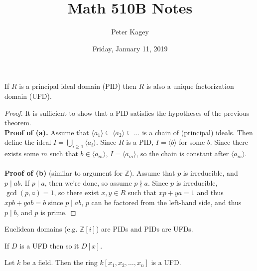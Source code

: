 \documentclass{article}
\newenvironment{note}[1][Note.]{
  \begin{trivlist} \item[\hskip \labelsep {\bfseries #1}]
}{\end{trivlist}}
\newenvironment{theorem}[1][Theorem.]{
  \begin{trivlist} \item[\hskip \labelsep {\bfseries #1}]
}{\end{trivlist}}
\newcommand{\ang}[1]{\langle #1 \rangle}
\begin{document}
\title{Math 510B Notes}
\author{Peter Kagey}
\date{Friday, January 11, 2019}

\maketitle

\begin{theorem}[Corollary.]
  If $R$ is a principal ideal domain (PID) then $R$ is also a unique factorization domain (UFD).
\end{theorem}

\begin{proof}
  It is sufficient to show that a PID satisfies the hypotheses of the previous theorem.
  \\
  \textbf{Proof of (a).}
  Assume that $\ang{a_1} \subseteq \ang{a_2} \subseteq \hdots$ is a chain of
  (principal) ideals. Then define the ideal $I = \bigcup_{i\geq 1} \ang{a_i}$.
  Since $R$ is a PID, $I = \ang b$ for some $b$.
  Since there exists some $m$ such that $b \in \ang{a_m}$, $I = \ang{a_m}$, so
  the chain is constant after $\ang{a_m}$.
  \\~\\
  \textbf{Proof of (b)} (similar to argument for $\mathbb Z$).
  Assume that $p$ is irreducible, and $p \mid ab$. If $p \mid a$, then we're done, so
  assume $p \nmid a$. Since $p$ is irreducible, $\gcd(p, a) = 1$, so there exist
  $x, y \in R$ such that $xp + ya = 1$ and thus $xpb + yab = b$ since
  $p \mid ab$, $p$ can be factored from the left-hand side, and thus $p \mid b$,
  and $p$ is prime.
\end{proof}

\begin{note}
  Euclidean domains (e.g. $\mathbb Z[i]$) are PIDs and PIDs are UFDs.
\end{note}

\begin{theorem}
  If $D$ is a UFD then so it $D[x]$.
\end{theorem}

\begin{theorem}[Corollary.]
  Let $k$ be a field. Then the ring $k[x_1, x_2, \hdots, x_n]$ is a UFD.
\end{theorem}
\end{document}
